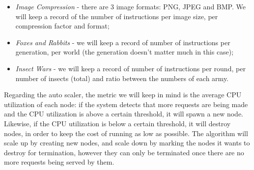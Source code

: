 \documentclass{article}
\begin{document}
\begin{itemize}
    \item \textit{Image Compression} - there are 3 image formats: PNG, JPEG and
        BMP. We will keep a record of the number of instructions per image size,
        per compression factor and format;
    \item \textit{Foxes and Rabbits} - we will keep a record of number of
        instructions per generation, per world (the generation doesn't matter
        much in this case);
    \item \textit{Insect Wars} - we will keep a record of number of instructions
        per round, per number of insects (total) and ratio between the numbers
        of each army.
\end{itemize}

Regarding the auto scaler, the metric we will keep in mind is the average CPU
utilization of each node: if the system detects that more requests are being
made and the CPU utilization is above a certain threshold, it will spawn a new
node. Likewise, if the CPU utilization is below a certain threshold, it will
destroy nodes, in order to keep the cost of running as low as possible. The
algorithm will scale up by creating new nodes, and scale down by marking the
nodes it wants to destroy for termination, however they can only be terminated
once there are no more requests being served by them.
\end{document}
